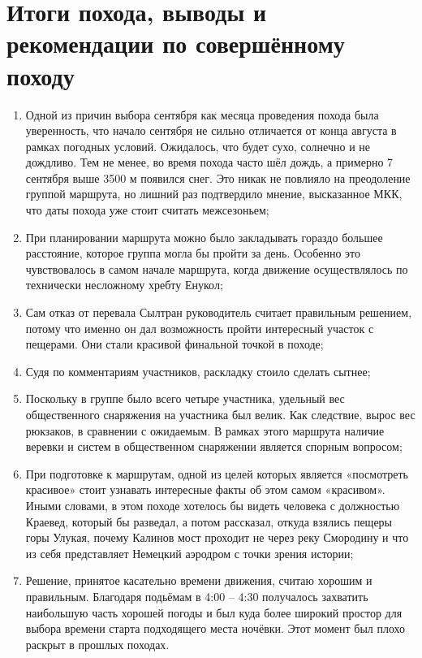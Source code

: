 \section{Итоги похода, выводы и рекомендации по совершённому походу}

	\begin{enumerate}
		\item Одной из причин выбора сентября как месяца проведения похода была уверенность, что начало сентября не сильно отличается от конца августа в рамках погодных условий. Ожидалось, что будет сухо, солнечно и не дождливо. Тем не менее, во время похода часто шёл дождь, а примерно 7 сентября выше 3500 м появился снег. Это никак не повлияло на преодоление группой маршрута, но лишний раз подтвердило мнение, высказанное МКК, что даты похода уже стоит считать межсезоньем; %
		\item ﻿﻿﻿При планировании маршрута можно было закладывать гораздо большее расстояние, которое группа могла бы пройти за день. Особенно это чувствовалось в самом начале маршрута, когда движение осуществлялось по технически несложному хребту Енукол;
		\item ﻿﻿﻿Сам отказ от перевала Сылтран руководитель считает правильным решением, %
		 потому что именно он дал возможность пройти интересный участок с пещерами. Они стали красивой финальной точкой в походе;
		\item ﻿﻿﻿Судя по комментариям участников, раскладку стоило сделать сытнее;
		﻿\item ﻿﻿Поскольку в группе было всего четыре участника, удельный вес общественного снаряжения на участника был велик. Как следствие, вырос вес рюкзаков, в сравнении с ожидаемым. В рамках этого маршрута наличие веревки и систем %
		в общественном снаряжении является спорным вопросом;
		\item ﻿﻿﻿При подготовке к маршрутам, одной из целей которых является «посмотреть красивое» стоит узнавать интересные факты об этом самом «красивом». Иными словами, в этом походе хотелось бы видеть человека с должностью Краевед, который бы разведал, а потом рассказал, откуда взялись пещеры горы Улукая, почему Калинов мост проходит не через реку Смородину и что из себя представляет Немецкий аэродром с точки зрения истории;
		\item ﻿﻿﻿Решение, принятое касательно времени движения, считаю хорошим и правильным. Благодаря подьёмам в 4:00 -- 4:30 получалось захватить наибольшую часть хорошей погоды и был куда более широкий простор для выбора времени старта подходящего места ночёвки. Этот момент был плохо раскрыт в прошлых походах. %
		
	\end{enumerate} 

	\clearpage